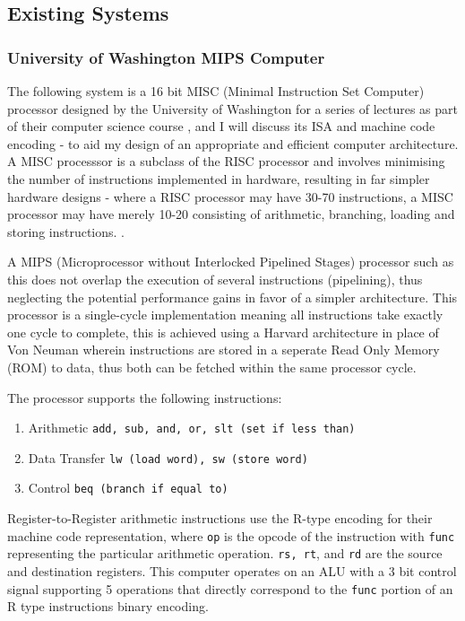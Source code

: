 \subsection{Existing Systems}
\subsubsection{University of Washington MIPS Computer}
The following system is a 16 bit MISC (Minimal Instruction Set Computer) processor designed by the University of Washington for a series of lectures as part of their computer science course \textcite{MIPS-uw}, and I will discuss its ISA and machine code encoding - to aid my design of an appropriate and efficient computer architecture. A MISC processsor is a subclass of the RISC processor and involves minimising the number of instructions implemented in hardware, resulting in far simpler hardware designs - where a RISC processor may have 30-70 instructions, a MISC processor may have merely 10-20 consisting of arithmetic, branching, loading and storing instructions. \textcite{MISC-dakeng}. 

A MIPS (Microprocessor without Interlocked Pipelined Stages) processor such as this does not overlap the execution of several instructions (pipelining), thus neglecting the potential performance gains in favor of a simpler architecture. This processor is a single-cycle implementation meaning all instructions take exactly one cycle to complete, this is achieved using a Harvard architecture in place of Von Neuman wherein instructions are stored in a seperate Read Only Memory (ROM) to data, thus both can be fetched within the same processor cycle. 

The processor supports the following instructions:
\begin{enumerate}
    \item Arithmetic \texttt{add, sub, and, or, slt (set if less than)}
    \item Data Transfer \texttt{lw (load word), sw (store word)}
    \item Control \texttt{beq (branch if equal to)}
\end{enumerate} 
Register-to-Register arithmetic instructions use the R-type encoding for their machine code representation, where \texttt{op} is the opcode of the instruction with \texttt{func} representing the particular arithmetic operation. \texttt{rs, rt}, and \texttt{rd} are the source and destination registers. This computer operates on an ALU with a 3 bit control signal supporting 5 operations that directly correspond to the \texttt{func} portion of an R type instructions binary encoding. 

